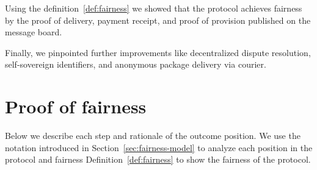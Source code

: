 \documentclass[pdftex,twocolumn,epjc3]{svjour3}
\begin{document}
{Using the definition~\ref{def:fairness} we showed that the protocol achieves fairness by the proof of delivery, payment receipt, and proof of provision published on the message board. 

Finally, we pinpointed further improvements like decentralized dispute resolution, self-sovereign identifiers, and anonymous package delivery via courier.

\appendix

\section{Proof of fairness}\label{app:proof-of-fairness}
Below we describe each step and rationale of the outcome position.
We use the notation introduced in Section~\ref{sec:fairness-model} to analyze each position in the protocol and fairness Definition~\ref{def:fairness} to show the fairness of the protocol.

\newcommand{\AgreeablePath}{Agreeable path:}
\newcommand{\DisputePath}{The \customer{} starts a dispute:}
\newcommand{\Fairness}{Fairness:}
\newcommand{\CustomerTurn}[0]{\expandafter\MakeUppercase \customer{} turn:}
\newcommand{\SPTurn}[0]{\sp{} turn:}

\newcommand{\CanFollowToOne}[2]{The #1 can follow the protocol to the non-disadvantaged position #2}
\newcommand{\CanDoNothing}[1]{The #1 can do nothing and always ends up in the non-disadvantaged position}
\newcommand{\CanDoAnything}[1]{The #1 can do anything and always ends up in the non-disadvantaged position}
\newcommand{\Pos}[4]{$\operatorname{\sigma_{#1, #2, #3} = #4}$}
\newcommand{\WinForTheSameReason}[1]{The #1 wins the dispute for the same reason}
\newcommand{\LoseForTheSameReason}[1]{The #1 loses the dispute for the same reason}
\newcommand{\ActedAbnormallyThen}[1]{The #1 acted abnormally, then:}
\newcommand{\CustomerPaidButDidntGetResult}{the customer ends up in a disadvantaged position as he paid in advance but didn't receive the result}
\newcommand{\SpReceivedThePayment}{the SP ends up in the advantaged position as she received the payment}

\newcommand{\CustomerLosesBeforePayment}{The customer loses the dispute because the SP is not obligated to do anything until the transaction is paid}
\newcommand{\CustomerLosesBeforePoP}{The customer loses the dispute because the SP still can publish the PoP within the agreed timeframe}

\newcommand{\RemainsIn}[2]{The #1 remains in the #2 position}

}
\end{document}
